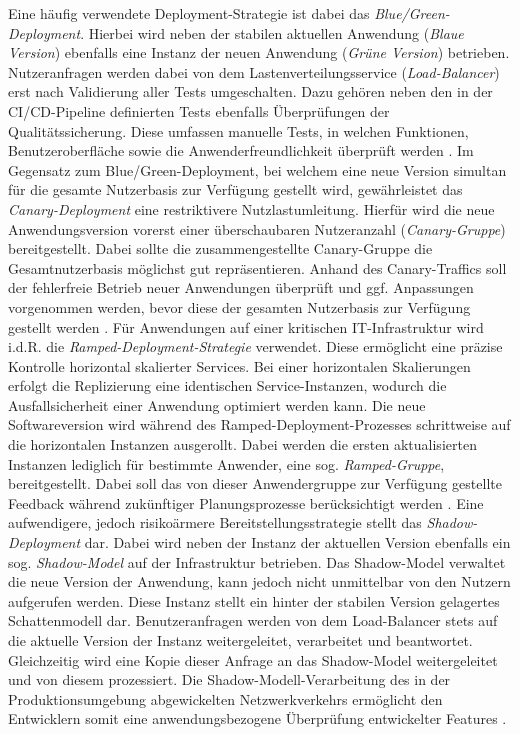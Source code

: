 Eine häufig verwendete Deployment-Strategie ist dabei das \textit{Blue/Green-Deployment}. Hierbei wird neben der stabilen aktuellen Anwendung (\textit{Blaue Version}) ebenfalls eine Instanz der neuen Anwendung (\textit{Grüne Version}) betrieben. Nutzeranfragen werden dabei von dem Lastenverteilungsservice (\textit{Load-Balancer}) erst nach Validierung aller Tests umgeschalten. Dazu gehören neben den in der CI/CD-Pipeline definierten Tests ebenfalls Überprüfungen der Qualitätssicherung. Diese umfassen manuelle Tests, in welchen Funktionen, Benutzeroberfläche sowie die Anwenderfreundlichkeit überprüft werden \cite{Ugochi.20220503}. Im Gegensatz zum Blue/Green-Deployment, bei welchem eine neue Version simultan für die gesamte Nutzerbasis zur Verfügung gestellt wird, gewährleistet das \textit{Canary-Deployment} eine restriktivere Nutzlastumleitung. Hierfür wird die neue Anwendungsversion vorerst einer überschaubaren Nutzeranzahl (\textit{Canary-Gruppe}) bereitgestellt. Dabei sollte die zusammengestellte Canary-Gruppe die Gesamtnutzerbasis möglichst gut repräsentieren. Anhand des Canary-Traffics soll der fehlerfreie Betrieb neuer Anwendungen überprüft und ggf. Anpassungen vorgenommen werden, bevor diese der gesamten Nutzerbasis zur Verfügung gestellt werden \cite{Ugochi.20220503}. Für Anwendungen auf einer kritischen IT-Infrastruktur wird i.d.R. die \textit{Ramped-Deployment-Strategie} verwendet. Diese ermöglicht eine präzise Kontrolle horizontal skalierter Services. Bei einer horizontalen Skalierungen erfolgt die Replizierung eine identischen Service-Instanzen, wodurch die Ausfallsicherheit einer Anwendung optimiert werden kann. Die neue Softwareversion wird während des Ramped-Deployment-Prozesses schrittweise auf die horizontalen Instanzen ausgerollt. Dabei werden die ersten aktualisierten Instanzen lediglich für bestimmte Anwender, eine sog. \textit{Ramped-Gruppe}, bereitgestellt. Dabei soll das von dieser Anwendergruppe zur Verfügung gestellte Feedback während zukünftiger Planungsprozesse berücksichtigt werden \cite{Ugochi.20220503}. Eine aufwendigere, jedoch risikoärmere Bereitstellungsstrategie stellt das \textit{Shadow-Deployment} dar. Dabei wird neben der Instanz der aktuellen Version ebenfalls ein sog. \textit{Shadow-Model} auf der Infrastruktur betrieben. Das Shadow-Model verwaltet die neue Version der Anwendung, kann jedoch nicht unmittelbar von den Nutzern aufgerufen werden. Diese Instanz stellt ein hinter der stabilen Version gelagertes Schattenmodell dar. Benutzeranfragen werden von dem Load-Balancer stets auf die aktuelle Version der Instanz weitergeleitet, verarbeitet und beantwortet. Gleichzeitig wird eine Kopie dieser Anfrage an das Shadow-Model weitergeleitet und von diesem prozessiert. Die Shadow-Modell-Verarbeitung des in der Produktionsumgebung abgewickelten Netzwerkverkehrs ermöglicht den Entwicklern somit eine anwendungsbezogene Überprüfung entwickelter Features \cite{Ugochi.20220503}. 